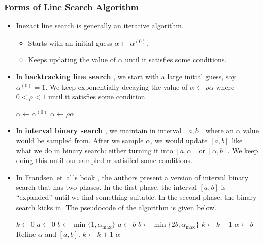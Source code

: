 \documentclass[10pt]{article}
\newcommand{\etal}{{et~al.}}
\begin{document}
\subsubsection{Forms of Line Search Algorithm}

\begin{itemize}
    \item Inexact line search is generally an iterative algorithm.
    \begin{itemize}
        \item Starts with an initial guess $\alpha \gets \alpha^{(0)}$.
        \item Keeps updating the value of $\alpha$ until it satisfies some conditions.
    \end{itemize}

    \item In {\bf backtracking line search} \cite{Cao:2021}, we start with a large initial guess, say $\alpha^{(0)} = 1$. We keep exponentially decaying the value of $\alpha \gets \rho \alpha$  where $0 < \rho < 1$ until it satisfies some condition.
    \medskip
    \begin{algorithmic}
        \State $\alpha \gets \alpha^{(0)}$
            \State $\alpha \gets \rho \alpha$
        \EndWhile        
    \end{algorithmic}

    \item In {\bf interval binary search} \cite{Frandsen:2004}, we maintain in interval $[a,b]$ where an $\alpha$ value would be sampled from. After we sample $\alpha$, we would update $[a,b]$ like what we do in binary search: either turning it into $[a,\alpha]$ or $[\alpha,b]$. We keep doing this until our sampled $\alpha$ satisifed some conditions.

    \item In Frandsen~\etal's book \cite{Frandsen:2004}, the authors present a version of interval binary search that has two phases. In the first phase, the interval $[a,b]$ is ``expanded'' until we find something suitable. In the second phase, the binary search kicks in. The pseudocode of the algorithm is given below.
    \medskip
    \begin{algorithmic}
        \State $k \gets 0$
        \State $a \gets 0$
        \State $b \gets \min\{1, \alpha_{\max}\}$
            \State $a \gets b$
            \State $b \gets \min\{2b, \alpha_{\max}\}$
            \State $k \gets k+1$            
        \EndWhile
        \State $\alpha \gets b$
            \State Refine $\alpha$ and $[a,b]$.
            \State $k \gets k+1$
        \EndWhile
        \State \Return $\alpha$
    \end{algorithmic}
\end{itemize}
\end{document}
